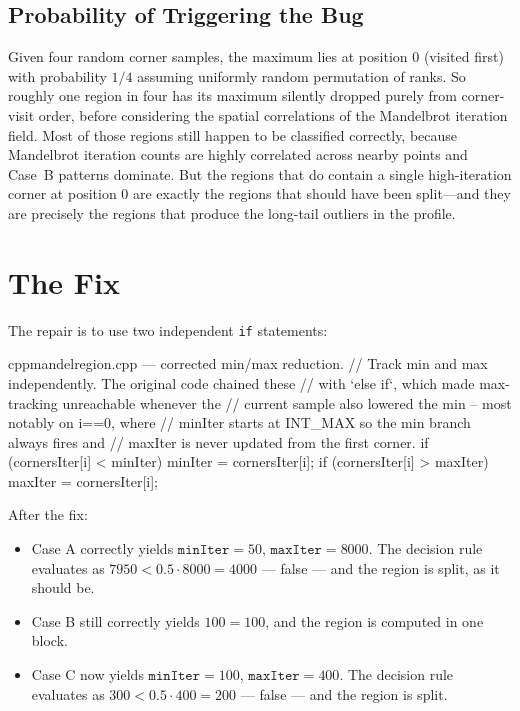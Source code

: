 \documentclass[
	english,
	letterpaper, oneside
]{article}
\begin{document}
\subsection{Probability of Triggering the Bug}

Given four random corner samples, the maximum lies at position $0$
(visited first) with probability $1/4$ assuming uniformly random
permutation of ranks. So roughly one region in four has its maximum
silently dropped purely from corner-visit order, before considering the
spatial correlations of the Mandelbrot iteration field. Most of those
regions still happen to be classified correctly, because Mandelbrot
iteration counts are highly correlated across nearby points and Case~B
patterns dominate. But the regions that do contain a single
high-iteration corner at position 0 are exactly the regions that should
have been split—and they are precisely the regions that produce the
long-tail outliers in the profile.

\section{The Fix}

The repair is to use two independent \texttt{if} statements:

\begin{sourcecode}{cpp}{mandelregion.cpp — corrected min/max reduction.}
// Track min and max independently. The original code chained these
// with `else if`, which made max-tracking unreachable whenever the
// current sample also lowered the min -- most notably on i==0, where
// minIter starts at INT_MAX so the min branch always fires and
// maxIter is never updated from the first corner.
if (cornersIter[i] < minIter)
  minIter = cornersIter[i];
if (cornersIter[i] > maxIter)
  maxIter = cornersIter[i];
\end{sourcecode}

After the fix:

\begin{itemize}
    \item Case A correctly yields $\texttt{minIter} = 50$,
          $\texttt{maxIter} = 8000$. The decision rule evaluates as
          $7950 < 0.5 \cdot 8000 = 4000$ — false — and the region is
          split, as it should be.
    \item Case B still correctly yields $100 = 100$, and the region
          is computed in one block.
    \item Case C now yields $\texttt{minIter} = 100$,
          $\texttt{maxIter} = 400$. The decision rule evaluates as
          $300 < 0.5 \cdot 400 = 200$ — false — and the region is split.
\end{itemize}
\end{document}
